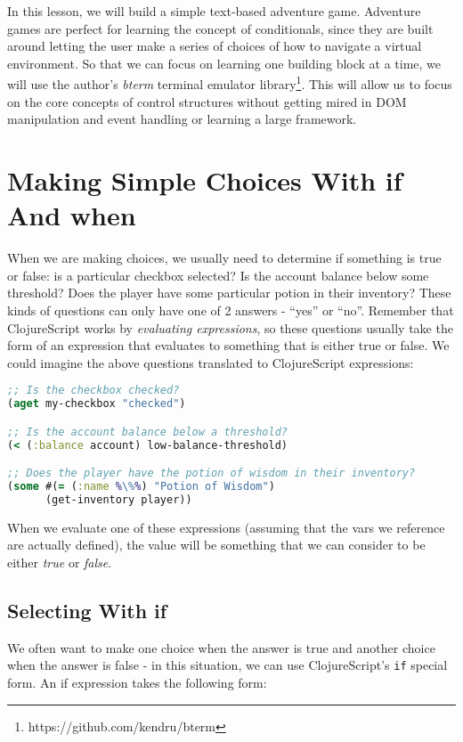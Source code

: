 \documentclass[10pt,twoside,openright]{memoir}
\begin{document}
In this lesson, we will build a simple text-based adventure game.
Adventure games are perfect for learning the concept of conditionals,
since they are built around letting the user make a series of choices of
how to navigate a virtual environment. So that we can focus on learning
one building block at a time, we will use the author's
\emph{bterm} terminal emulator library\footnote{https://github.com/kendru/bterm}.
This will allow us to focus on the core concepts of control structures
without getting mired in DOM manipulation and event handling or learning
a large framework.

\section{Making Simple Choices With if And when}

When we are making choices, we usually need to determine if something is
true or false: is a particular checkbox selected? Is the account balance
below some threshold? Does the player have some particular potion in
their inventory? These kinds of questions can only have one of 2 answers
- ``yes'' or ``no''. Remember that ClojureScript works by
\emph{evaluating expressions}, so these questions usually take the form
of an expression that evaluates to something that is either true or
false. We could imagine the above questions translated to ClojureScript
expressions:

\begin{lstlisting}[language=Clojure, caption={Expressions that ask questions}]
;; Is the checkbox checked?
(aget my-checkbox "checked")

;; Is the account balance below a threshold?
(< (:balance account) low-balance-threshold)

;; Does the player have the potion of wisdom in their inventory?
(some #(= (:name %\%%) "Potion of Wisdom")
      (get-inventory player))
\end{lstlisting}

When we evaluate one of these expressions (assuming that the vars we
reference are actually defined), the value will be something that we can
consider to be either \emph{true} or \emph{false}.

\subsection{Selecting With if}

We often want to make one choice when the answer is true and another
choice when the answer is false - in this situation, we can use
ClojureScript's \texttt{if} special form. An if expression takes the
following form:
\end{document}

